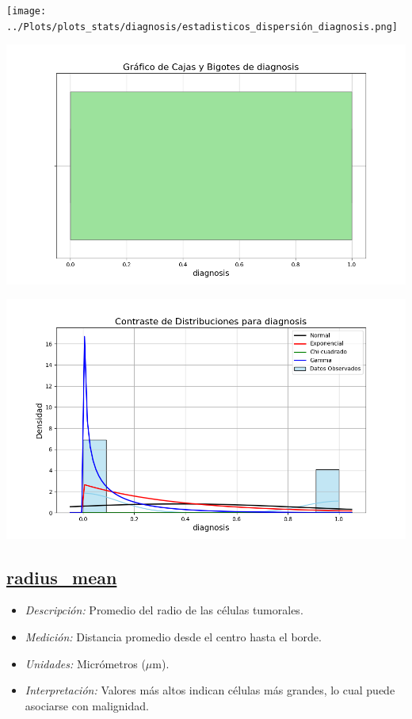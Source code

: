 \documentclass[a4paper, 12pt]{article}
\begin{document}
	\texttt{[image: ../Plots/plots\_stats/diagnosis/estadisticos\_dispersión\_diagnosis.png]}



	\includegraphics[width=\textwidth]{../Plots/plots_stats/diagnosis/boxplot_diagnosis.png}
	



	\includegraphics[width=\textwidth]{../Plots/plots_stats/diagnosis/distribuciones_conocidas_diagnosis.png}


\subsection*{\underline{radius\_mean}}

 \begin{itemize}
	\item \textit{Descripción:} Promedio del radio de las células tumorales.
	\item \textit{Medición:} Distancia promedio desde el centro hasta el borde.
	\item \textit{Unidades:} Micrómetros ($\mu$m).
	\item \textit{Interpretación:} Valores más altos indican células más grandes, lo cual puede asociarse con malignidad.
\end{itemize}
\end{document}
